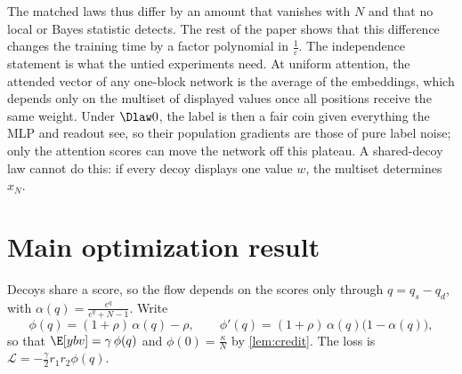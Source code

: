 The matched laws thus differ by an amount that vanishes with $N$ and that no local or Bayes statistic detects. The rest of the paper
shows that this difference changes the training time by a factor polynomial in $\tfrac{1}{\varepsilon}$.
The independence statement is what the untied experiments need. At uniform attention, the attended vector of any one-block network is
the average of the embeddings, which depends only on the multiset of displayed values once all positions receive the same weight.
Under $\Dlaw0$, the label is then a fair coin given everything the MLP and readout see, so their population gradients are those of
pure label noise; only the attention scores can move the network off this plateau.
A shared-decoy law cannot do this: if every decoy displays one value $w$, the multiset determines $x_N$.

\section{Main optimization result}
\label{sec:dynamics}

Decoys share a score, so the flow depends on the scores only through $q=q_s-q_d$, with
$\alpha(q)=\tfrac{e^q}{e^q+N-1}$. Write
\[
 \phi(q)=(1+\rho)\,\alpha(q)-\rho,\qquad \phi'(q)=(1+\rho)\,\alpha(q)\bigl(1-\alpha(q)\bigr),
\]
so that $\E[y b v]=\gamma\,\phi(q)$ and $\phi(0)=\tfrac{\kappa}{N}$ by \cref{lem:credit}. The loss is $\mathcal L=-\tfrac{\gamma}{2}r_1r_2\phi(q)$.


